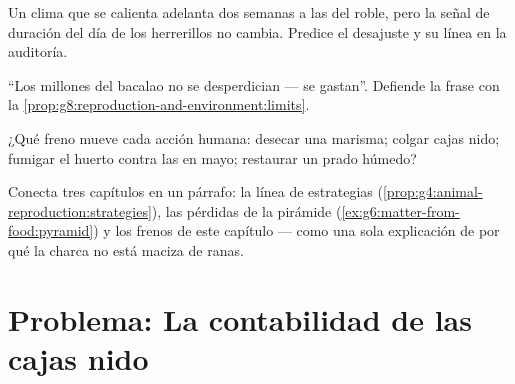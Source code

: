 \begin{exercise}[$\star\star$]\label{exo:g8:reproduction-and-environment:9}
Un clima que se calienta adelanta dos semanas a las  del roble,
pero la señal de duración del día de los herrerillos no cambia. Predice
el desajuste y su línea en la auditoría.
\end{exercise}

\begin{exercise}[$\star\star$]\label{exo:g8:reproduction-and-environment:10}
``Los millones del bacalao no se desperdician --- se gastan''. Defiende
la frase con la \cref{prop:g8:reproduction-and-environment:limits}.
\end{exercise}

\begin{exercise}[$\star\star$]\label{exo:g8:reproduction-and-environment:11}
¿Qué freno mueve cada acción humana: desecar una marisma; colgar cajas
nido; fumigar el huerto contra las  en mayo; restaurar un prado
húmedo?
\end{exercise}

\begin{exercise}[$\star\star\star$]\label{exo:g8:reproduction-and-environment:12}
Conecta tres capítulos en un párrafo: la línea de estrategias
(\cref{prop:g4:animal-reproduction:strategies}), las pérdidas de la
pirámide (\cref{ex:g6:matter-from-food:pyramid}) y los frenos de este
capítulo --- como una sola explicación de por qué la charca no está
maciza de ranas.
\end{exercise}

\section{Problema: La contabilidad de las cajas nido}

